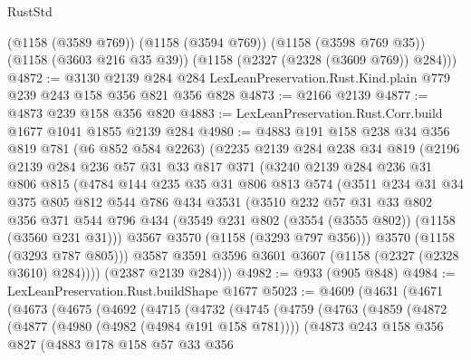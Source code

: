 \begin{lexlean}{RustStd}
\begin{coremodule}
      (@1158 (@3589 @769))
      (@1158 (@3594 @769))
      (@1158 (@3598 @769 @35))
      (@1158 (@3603 @216 @35 @39))
      (@1158 (@2327 (@2328 (@3609 @769)) @284)))
@4872 := @3130
    @2139
    @284
    @284
    LexLeanPreservation.Rust.Kind.plain
    @779
    @239
    @243
    @158
    @356
    @821
    @356
    @828
@4873 := @2166 @2139
@4877 := @4873 @239 @158 @356 @820
@4883 := LexLeanPreservation.Rust.Corr.build @1677 @1041 @1855 @2139 @284
@4980 := @4883
    @191
    @158
    @238
    @34
    @356
    @819
    @781
    (@6 @852 @584 @2263)
    (@2235
      @2139
      @284
      @238
      @34
      @819
      (@2196
        @2139
        @284
        @236
        @57
        @31
        @33
        @817
        @371
        (@3240
          @2139
          @284
          @236
          @31
          @806
          @815
          (@4784
            @144
            @235
            @35
            @31
            @806
            @813
            @574
            (@3511
              @234
              @31
              @34
              @375
              @805
              @812
              @544
              @786
              @434
              @3531
              (@3510
                @232
                @57
                @31
                @33
                @802
                @356
                @371
                @544
                @796
                @434
                (@3549 @231 @802 (@3554 (@3555 @802)) (@1158 (@3560 @231 @31)))
                @3567
                @3570
                (@1158 (@3293 @797 @356)))
              @3570
              (@1158 (@3293 @787 @805)))
            @3587
            @3591
            @3596
            @3601
            @3607
            (@1158 (@2327 (@2328 @3610) @284))))
        (@2387 @2139 @284)))
@4982 := @933 (@905 @848)
@4984 := LexLeanPreservation.Rust.buildShape @1677
@5023 := @4609
    (@4631
      (@4671
        (@4673
          (@4675
            (@4692
              (@4715
                (@4732
                  (@4745
                    (@4759
                      (@4763
                        (@4859
                          (@4872
                            (@4877 (@4980 (@4982 (@4984 @191 @158 @781))))
                            (@4873
                              @243
                              @158
                              @356
                              @827
                              (@4883
                                @178
                                @158
                                @57
                                @33
                                @356

\end{coremodule}
\end{lexlean}
